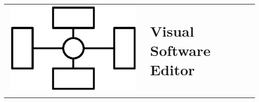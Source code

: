 \documentclass[a4paper,11pt,oneside]{book}
\begin{document}
  \title
  {
      {
    \begin{tabular}{>{\centering\arraybackslash}m{3.8 cm}l}
        \vspace{0.3 cm}\includegraphics[width=100 pt]{../Documentation/_common/logo} & \textbf{Visual Software Editor}
    \end{tabular}
  }
      }
  \date{}
  \maketitle
\end{document}

